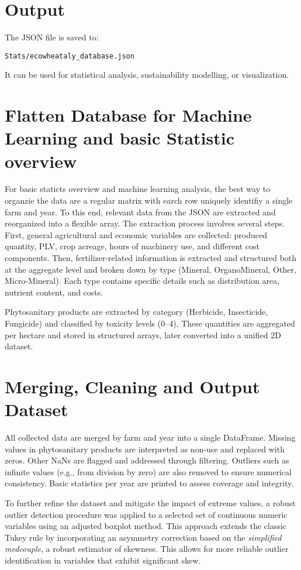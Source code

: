 \documentclass[11pt,a4paper]{article}
\begin{document}
\section*{Output}
The JSON file is saved to:
\begin{verbatim}
Stats/ecowheataly_database.json
\end{verbatim}
It can be used for statistical analysis, sustainability modelling, or visualization.


\section{Flatten Database for Machine Learning and basic Statistic overview}

For basic staticts overview and machine learning analysis, the best way to organzie the data are a regular matrix with earch row uniquely identifiy a single farm and year.
To this end, relevant data from the JSON are extracted and reorganized into a flexible array.
The extraction process involves several steps. First, general agricultural and economic variables are collected: produced quantity, PLV, crop acreage, hours of machinery use, and different cost components. Then, fertilizer-related information is extracted and structured both at the aggregate level and broken down by type (Mineral, OrganoMineral, Other, Micro-Mineral). Each type contains specific details such as distribution area, nutrient content, and costs.

Phytosanitary products are extracted by category (Herbicide, Insecticide, Fungicide) and classified by toxicity levels (0–4). These quantities are aggregated per hectare and stored in structured arrays, later converted into a unified 2D dataset.

\section{Merging, Cleaning and Output Dataset}

All collected data are merged by farm and year into a single DataFrame. Missing values in phytosanitary products are interpreted as non-use and replaced with zeros. Other NaNs are flagged and addressed through filtering. Outliers such as infinite values (e.g., from division by zero) are also removed to ensure numerical consistency. Basic statistics per year are printed to assess coverage and integrity.

To further refine the dataset and mitigate the impact of extreme values, a robust outlier detection procedure was applied to a selected set of continuous numeric variables using an adjusted boxplot method. This approach extends the classic Tukey rule by incorporating an asymmetry correction based on the \textit{simplified medcouple}, a robust estimator of skewness. This allows for more reliable outlier identification in variables that exhibit significant skew.
\end{document}
